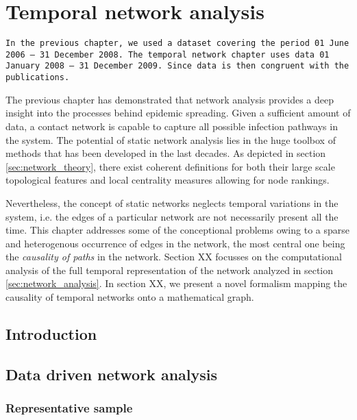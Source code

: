 \chapter{Temporal network analysis}
\texttt{In the previous chapter, we used a dataset covering the period 01 June 2006 -- 31 December 2008.
The temporal network chapter uses data 01 January 2008 -- 31 December 2009.
Since data is then congruent with the publications.}

The previous chapter has demonstrated that network analysis provides a deep insight into the processes behind epidemic spreading.
Given a sufficient amount of data, a contact network is capable to capture all possible infection pathways in the system.
The potential of static network analysis lies in the huge toolbox of methods that has been developed in the last decades.
As depicted in section \ref{sec:network_theory}, there exist coherent definitions for both their large scale topological features and local centrality measures allowing for node rankings.

Nevertheless, the concept of static networks neglects temporal variations in the system, i.e. the edges of a particular network are not necessarily present all the time.
This chapter addresses some of the conceptional problems owing to a sparse and heterogenous occurrence of edges in the network, the most central one being the \emph{causality of paths} in the network.
Section XX focusses on the computational analysis of the full temporal representation of the network analyzed in section \ref{sec:network_analysis}.
In section XX, we present a novel formalism mapping the causality of temporal networks onto a mathematical graph.


\section{Introduction}


\section{Data driven network analysis}

\subsection{Representative sample}

